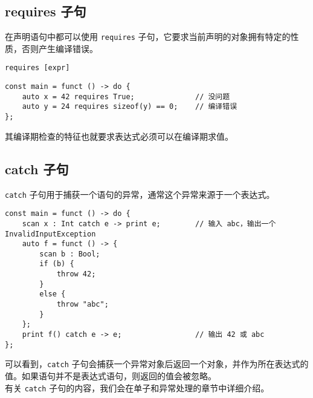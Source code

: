 \subsection{requires 子句}

在声明语句中都可以使用 \lstinline!requires! 子句，它要求当前声明的对象拥有特定的性质，否则产生编译错误。

\begin{grammar} \label{grm:requires-clause}
	\lstinline!requires [expr]!
\end{grammar}

\begin{lstlisting}
const main = funct () -> do {
	auto x = 42 requires True;				// 没问题
	auto y = 24 requires sizeof(y) == 0;	// 编译错误
};
\end{lstlisting}

其编译期检查的特征也就要求表达式必须可以在编译期求值。

\subsection{catch 子句}

\lstinline!catch! 子句用于捕获一个语句的异常，通常这个异常来源于一个表达式。

\begin{lstlisting}
const main = funct () -> do {
    scan x : Int catch e -> print e;		// 输入 abc，输出一个 InvalidInputException
    auto f = funct () -> { 
        scan b : Bool;
        if (b) {
            throw 42;
        }
        else {
            throw "abc";
        }
    };
    print f() catch e -> e;					// 输出 42 或 abc
};
\end{lstlisting}

可以看到，\lstinline!catch! 子句会捕获一个异常对象后返回一个对象，并作为所在表达式的值。如果语句并不是表达式语句，则返回的值会被忽略。 \\

有关 \lstinline!catch! 子句的内容，我们会在单子和异常处理的章节中详细介绍。
